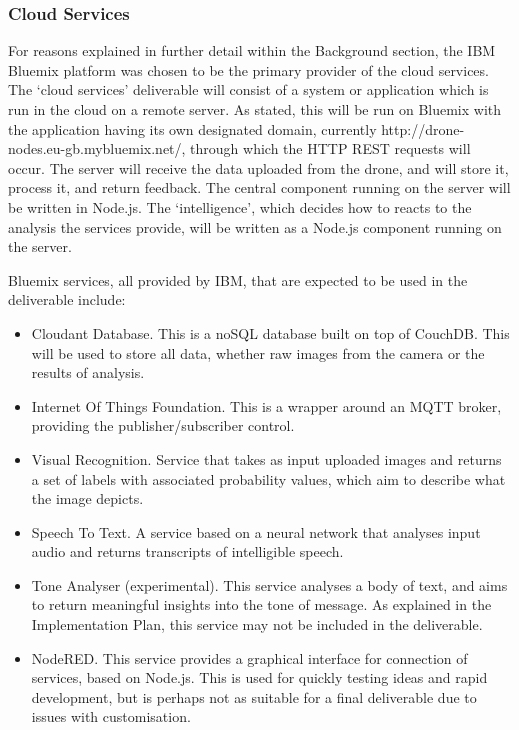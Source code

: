 \documentclass{article}
\begin{document}
\subsubsection{Cloud Services}
For reasons explained in further detail within the Background section, the IBM Bluemix platform was chosen to be the primary provider of the cloud services. The `cloud services' deliverable will consist of a system or application which is run in the cloud on a remote server. As stated, this will be run on Bluemix with the application having its own designated domain, currently http://drone-nodes.eu-gb.mybluemix.net/, through which the HTTP REST requests will occur. The server will receive the data uploaded from the drone, and will store it, process it, and return feedback. The central component running on the server will be written in Node.js. The `intelligence', which decides how to reacts to the analysis the services provide, will be written as a Node.js component running on the server.

\vspace{\baselineskip} \noindent
Bluemix services, all provided by IBM, that are expected to be used in the deliverable include:
\begin{itemize}
    \item Cloudant Database. This is a noSQL database built on top of CouchDB. This will be used to store all data, whether raw images from the camera or the results of analysis.
    \item Internet Of Things Foundation. This is a wrapper around an MQTT broker, providing the publisher/subscriber control.
    \item Visual Recognition. Service that takes as input uploaded images and returns a set of labels with associated probability values, which aim to describe what the image depicts.
    \item Speech To Text. A service based on a neural network that analyses input audio and returns transcripts of intelligible speech.
    \item Tone Analyser (experimental). This service analyses a body of text, and aims to return meaningful insights into the tone of message. As explained in the Implementation Plan, this service may not be included in the deliverable.
    \item NodeRED. This service provides a graphical interface for connection of services, based on Node.js. This is used for quickly testing ideas and rapid development, but is perhaps not as suitable for a final deliverable due to issues with customisation.
\end{itemize}
\end{document}
